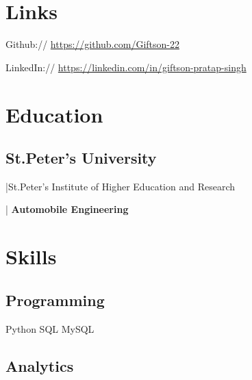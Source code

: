\documentclass[]{deedy-resume-reversed}
\begin{document}
\begin{minipage}[t]{0.65\textwidth}
\sectionsep


\section{Links}

Github://
\href{https://github.com/Giftson-22}{https://github.com/Giftson-22}

LinkedIn://
\href{https://linkedin.com/in/giftson-pratap-singh}{https://linkedin.com/in/giftson-pratap-singh}

\end{minipage}
\hfill
\begin{minipage}[t]{0.30\textwidth}


\section{Education}

\subsection{St.Peter's University}|{St.Peter's Institute of Higher Education and Research}

 | {\textbf{Automobile Engineering}}


\sectionsep


\section{Skills}

\subsection{Programming}

\textbullet{} Python \textbullet{} SQL \textbullet{} MySQL


\sectionsep

\subsection{Analytics}


\end{minipage}
\end{document}
